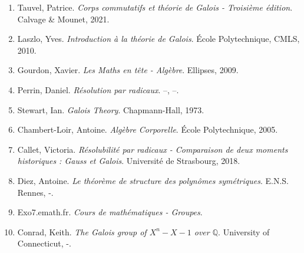\documentclass[5pt,a4paper]{article}
\begin{document}
\begin{onehalfspacing}
\begin{enumerate}
\item Tauvel, Patrice. \textit{Corps commutatifs et théorie de Galois - Troisième édition}. Calvage \& Mounet, 2021.
\item Laszlo, Yves. \textit{Introduction à la théorie de Galois}. École Polytechnique, CMLS, 2010.
\item Gourdon, Xavier. \textit{Les Maths en tête - Algèbre}. Ellipses, 2009.
\item Perrin, Daniel. \textit{Résolution par radicaux}. --, --.
\item Stewart, Ian. \textit{Galois Theory}. Chapmann-Hall, 1973.
\item Chambert-Loir, Antoine. \textit{Algèbre Corporelle}. École Polytechnique, 2005.
\item Callet, Victoria. \textit{Résolubilité par radicaux - Comparaison de deux moments historiques : Gauss et Galois}. Université de Strasbourg, 2018.
\item Diez, Antoine. \textit{Le théorème de structure des polynômes symétriques}. E.N.S. Rennes, -.
\item Exo7.emath.fr. \textit{Cours de mathématiques - Groupes}. 
\item Conrad, Keith. \textit{The Galois group of $X^n - X - 1$ over $\mathbb{Q}$}. University of Connecticut, -.
\end{enumerate}

\end{onehalfspacing}
\end{document}
